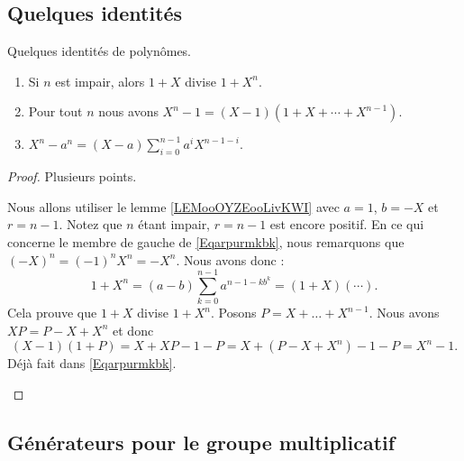 \subsection{Quelques identités}

\begin{lemma}   \label{LemISPooHIKJBU}
	Quelques identités de polynômes.
	\begin{enumerate}
		\item   \label{ItemLTBooAcyMtN}
		      Si \( n\) est impair, alors \( 1+X\) divise \( 1+X^n\).
		\item\label{ItemLTBooAcyMtNii}
		      Pour tout \( n\) nous avons \( X^n-1=(X-1)(1+X+\cdots +X^{n-1})\).
		\item       \label{ITEMooILIVooHtmWLm}
		      \( X^n-a^n=(X-a)\sum_{i=0}^{n-1}a^iX^{n-1-i}\).
	\end{enumerate}
\end{lemma}

\begin{proof}
	Plusieurs points.
	\begin{subproof}
		Nous allons utiliser le lemme \ref{LEMooOYZEooLivKWI} avec \( a=1\), \( b=-X\) et \( r=n-1\). Notez que \( n\) étant impair, \( r=n-1\) est encore positif. En ce qui concerne le membre de gauche de \eqref{Eqarpurmkbk}, nous remarquons que \( (-X)^n=(-1)^nX^n=-X^n\). Nous avons donc :
		\begin{equation}
			1+X^n=(a-b)\sum_{k=0}^{n-1}a^{n-1-kb^k}=(1+X)(\cdots).
		\end{equation}
		Cela prouve que \( 1+X\) divise \( 1+X^n\).
		Posons \( P=X+\ldots +X^{n-1}\). Nous avons \( XP=P-X+X^n\) et donc
		\begin{equation}
			(X-1)(1+P)=X+XP-1-P
			=X+(P-X+X^n)-1-P
			=X^n-1.
		\end{equation}
		Déjà fait dans \eqref{Eqarpurmkbk}.
	\end{subproof}
\end{proof}

\subsection{Générateurs pour le groupe multiplicatif}

